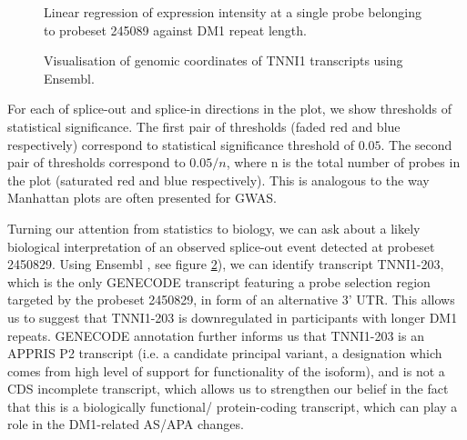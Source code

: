 \documentclass[10pt,letterpaper]{article}
\begin{document}
\begin{figure}[!h]
\caption{Linear regression of expression intensity at a single probe belonging to probeset 245089 against DM1 repeat length.}
\label{fig4}
\end{figure}

\begin{figure}[!h]
\caption{Visualisation of genomic coordinates of TNNI1 transcripts using Ensembl.}
\label{fig3}
\end{figure}


For each of splice-out and splice-in directions in the plot, we show thresholds of statistical significance. The first pair of thresholds (faded red and blue respectively) correspond to statistical significance threshold of $0.05$. The second pair of thresholds correspond to $0.05/n$, where n is the total number of probes in the plot (saturated red and blue respectively). This is analogous to the way Manhattan plots are often presented for GWAS.

Turning our attention from statistics to biology, we can ask about a likely biological interpretation of an observed splice-out event detected at probeset 2450829. Using Ensembl \cite{Kersey2017}, see figure \ref{fig3}), we can identify transcript TNNI1-203, which is the only GENECODE transcript featuring a probe selection region targeted by the probeset 2450829, in form of an alternative 3' UTR. This allows us to suggest that TNNI1-203 is downregulated in participants with longer DM1 repeats. GENECODE annotation further informs us that TNNI1-203 is an APPRIS P2 transcript (i.e. a candidate principal variant, a designation which comes from high level of support for functionality of the isoform), and is not a CDS incomplete transcript, which allows us to strengthen our belief in the fact that this is a biologically functional/ protein-coding transcript, which can play a role in the DM1-related AS/APA changes.
\end{document}
